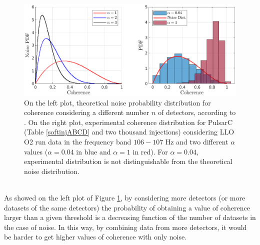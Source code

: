 \documentclass[11pt,a4paper,final]{iopart}
\begin{document}
\begin{figure}[htpb!]
        \includegraphics[clip,trim=35 0 0 10,scale=0.8]{cohe2in1.eps}
    \caption{On the left plot, theoretical noise probability distribution for coherence considering a different number $n$ of detectors, according to \cite{5nvec}. On the right plot, experimental coherence distribution for PulsarC (Table \ref{softinjABCD} and two thousand injections) considering LLO O2 run data in the frequency band $106-107$ Hz and two different $\alpha$ values ($\alpha=0.04$ in blue and $\alpha=1$ in red). For $\alpha=0.04$, experimental distribution is not distinguishable from the theoretical noise distribution. } 
    \label{pulsC}
     \vspace{-10pt}
\end{figure}
\\As showed on the left plot of Figure \ref{pulsC}, by considering more detectors (or more datasets of the same detectors) the probability of obtaining a value of coherence larger than a given threshold is a decreasing function of the number of datasets in the case of noise. In this way, by combining data from more detectors, it would be harder to get higher values of coherence with only noise.
\end{document}
